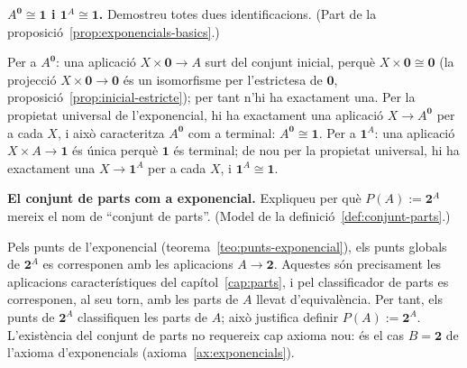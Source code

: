 \begin{exercici}
\textbf{\(A^{\mathbf0}\cong\mathbf1\) i \(\mathbf1^{A}\cong\mathbf1\).} Demostreu totes dues identificacions. (Part de la proposició~\ref{prop:exponencials-basics}.)
\end{exercici}
\begin{solucio}
Per a \(A^{\mathbf0}\): una aplicació \(X\times\mathbf0\to A\) surt del conjunt inicial, perquè \(X\times\mathbf0\cong\mathbf0\) (la projecció \(X\times\mathbf0\to\mathbf0\) és un isomorfisme per l'estrictesa de \(\mathbf0\), proposició~\ref{prop:inicial-estricte}); per tant n'hi ha exactament una. Per la propietat universal de l'exponencial, hi ha exactament una aplicació \(X\to A^{\mathbf0}\) per a cada \(X\), i això caracteritza \(A^{\mathbf0}\) com a terminal: \(A^{\mathbf0}\cong\mathbf1\). Per a \(\mathbf1^{A}\): una aplicació \(X\times A\to\mathbf1\) és única perquè \(\mathbf1\) és terminal; de nou per la propietat universal, hi ha exactament una \(X\to\mathbf1^{A}\) per a cada \(X\), i \(\mathbf1^{A}\cong\mathbf1\).
\end{solucio}

\begin{exercici}
\textbf{El conjunt de parts com a exponencial.} Expliqueu per què \(P(A):=\mathbf2^{A}\) mereix el nom de \enquote{conjunt de parts}. (Model de la definició~\ref{def:conjunt-parts}.)
\end{exercici}
\begin{solucio}
Pels punts de l'exponencial (teorema~\ref{teo:punts-exponencial}), els punts globals de \(\mathbf2^{A}\) es corresponen amb les aplicacions \(A\to\mathbf2\). Aquestes són precisament les aplicacions característiques del capítol~\ref{cap:parts}, i pel classificador de parts es corresponen, al seu torn, amb les parts de \(A\) llevat d'equivalència. Per tant, els punts de \(\mathbf2^{A}\) classifiquen les parts de \(A\); això justifica definir \(P(A):=\mathbf2^{A}\). L'existència del conjunt de parts no requereix cap axioma nou: és el cas \(B=\mathbf2\) de l'axioma d'exponencials (axioma~\ref{ax:exponencials}).
\end{solucio}

